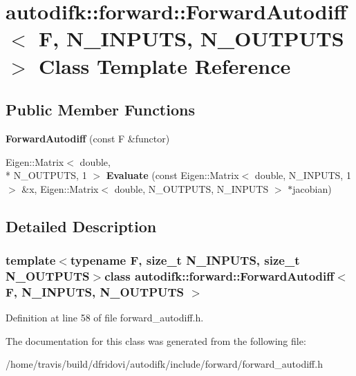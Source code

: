 \hypertarget{classautodifk_1_1forward_1_1_forward_autodiff}{\section{autodifk\-:\-:forward\-:\-:Forward\-Autodiff$<$ F, N\-\_\-\-I\-N\-P\-U\-T\-S, N\-\_\-\-O\-U\-T\-P\-U\-T\-S $>$ Class Template Reference}
\label{classautodifk_1_1forward_1_1_forward_autodiff}
}
\subsection*{Public Member Functions}
\begin{DoxyCompactItemize}
\item 
\hypertarget{classautodifk_1_1forward_1_1_forward_autodiff_a9aacd8358aff72dd81fae26b027dbb74}{{\bfseries Forward\-Autodiff} (const F \&functor)}\label{classautodifk_1_1forward_1_1_forward_autodiff_a9aacd8358aff72dd81fae26b027dbb74}

\item 
\hypertarget{classautodifk_1_1forward_1_1_forward_autodiff_a5c75bf31f586588cee8d02a130f25104}{Eigen\-::\-Matrix$<$ double, \\*
N\-\_\-\-O\-U\-T\-P\-U\-T\-S, 1 $>$ {\bfseries Evaluate} (const Eigen\-::\-Matrix$<$ double, N\-\_\-\-I\-N\-P\-U\-T\-S, 1 $>$ \&x, Eigen\-::\-Matrix$<$ double, N\-\_\-\-O\-U\-T\-P\-U\-T\-S, N\-\_\-\-I\-N\-P\-U\-T\-S $>$ $\ast$jacobian)}\label{classautodifk_1_1forward_1_1_forward_autodiff_a5c75bf31f586588cee8d02a130f25104}

\end{DoxyCompactItemize}


\subsection{Detailed Description}
\subsubsection*{template$<$typename F, size\-\_\-t N\-\_\-\-I\-N\-P\-U\-T\-S, size\-\_\-t N\-\_\-\-O\-U\-T\-P\-U\-T\-S$>$class autodifk\-::forward\-::\-Forward\-Autodiff$<$ F, N\-\_\-\-I\-N\-P\-U\-T\-S, N\-\_\-\-O\-U\-T\-P\-U\-T\-S $>$}



Definition at line 58 of file forward\-\_\-autodiff.\-h.



The documentation for this class was generated from the following file\-:\begin{DoxyCompactItemize}
\item 
/home/travis/build/dfridovi/autodifk/include/forward/forward\-\_\-autodiff.\-h\end{DoxyCompactItemize}
